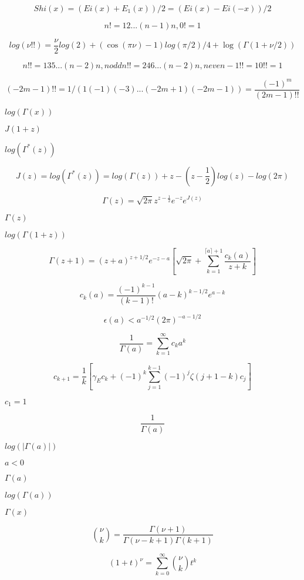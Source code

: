 \documentclass{article}
\begin{document}
\[ Shi(x) = (Ei(x) + E_1(x))/2 = (Ei(x) - Ei(-x))/2 \]
\pagebreak

\[ n! = 1 2 ... (n-1) n, 0! = 1 \]
\pagebreak

\[ log(\nu!!) = \frac{\nu}{2} log(2) + \left(\cos(\pi\nu) - 1\right) log(\pi/2) / 4 + \log(\Gamma(1 + \nu/2)) \]
\pagebreak

\[ n!! = 1 3 5 ... (n-2) n, n odd n!! = 2 4 6 ... (n-2) n, n even -1!! = 1 0!! = 1 \]
\pagebreak

\[ (-2m - 1)!! = 1 / (1 (-1) (-3) ... (-2m + 1) (-2m - 1)) = \frac{(-1)^m}{(2m-1)!!} \]
\pagebreak

$log(\Gamma(x))$
\pagebreak

$ J(1+z) $
\pagebreak

$ log(\Gamma^*(z)) $
\pagebreak

\[ J(z) = log(\Gamma^*(z)) = log\left(\Gamma(z)\right) + z - \left(z-\frac{1}{2}\right) log(z) - log(2\pi) \]
\pagebreak

\[ \Gamma(z) = \sqrt{2\pi}z^{z-\frac{1}{2}}e^{-z}e^{J(z)} \]
\pagebreak

$ \Gamma(z) $
\pagebreak

$ log(\Gamma(1+z)) $
\pagebreak

\[ \Gamma(z+1) = (z+a)^{z+1/2}e^{-z-a}\left[ \sqrt{2\pi} + \sum_{k=1}^{\lceil a \rceil + 1}\frac{c_k(a)}{z+k}\right] \]
\pagebreak

\[ c_k(a) = \frac{(-1)^{k-1}}{(k-1)!}(a-k)^{k-1/2}e^{a-k} \]
\pagebreak

\[ \epsilon(a) < a^{-1/2}(2\pi)^{-a-1/2} \]
\pagebreak

\[ \frac{1}{\Gamma(a)} = \sum_{k=1}^{\infty} c_k a^k \]
\pagebreak

\[ c_{k+1} = \frac{1}{k}\left[\gamma_E c_k + (-1)^k\sum_{j=1}^{k-1}(-1)^j\zeta(j+1-k)c_j\right] \]
\pagebreak

$ c_1 = 1 $
\pagebreak

\[ \frac{1}{\Gamma(a)} \]
\pagebreak

$ log(|\Gamma(a)|) $
\pagebreak

$ a < 0 $
\pagebreak

$ \Gamma(a) $
\pagebreak

$ log(\Gamma(a)) $
\pagebreak

$ \Gamma(x) $
\pagebreak

\[ \binom{\nu}{k} = \frac{\Gamma(\nu+1)}{\Gamma(\nu-k+1) \Gamma(k+1)} \]
\pagebreak

\[ \left(1 + t\right)^\nu = \sum_{k=0}^\infty \binom{\nu}{k} t^k \]
\pagebreak
\end{document}
